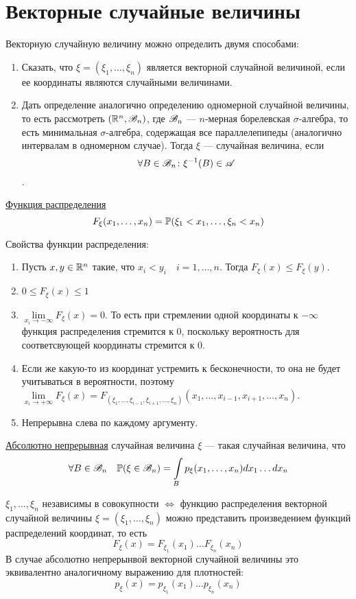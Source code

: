 \section{Векторные случайные величины}
Векторную случайную величину можно определить двумя способами:
\begin{enumerate}
	\item Сказать, что $\xi = (\xi_1, \ldots, \xi_n)$ является векторной случайной величиной, если ее координаты являются случайными величинами.
	\item Дать определение аналогично определению одномерной случайной величины, то есть рассмотреть $(\mathbb{R}^n, \mathscr{B}_n)$, где $\mathscr{B}_n$ --- $n$-мерная борелевская
	$\sigma$-алгебра, то есть минимальная $\sigma$-алгебра, содержащая все параллелепипеды (аналогично интервалам в одномерном случае). Тогда $\xi$ --- случайная величина, если $$\forall B \in \mathscr{B}_n \colon \xi^{-1}(B) \in \mathscr{A}$$. 
\end{enumerate}

\begin{Def}
\underline{Функция распределения} $$F_\xi(x_1, \ldots, x_n) = \mathbb{P}(\xi_1 < x_1, \ldots, \xi_n < x_n)$$
\end{Def}

Свойства функции распределения:
\begin{enumerate}
	\item Пусть $x, y \in \mathbb{R}^n$ такие, что $x_i < y_i \quad i = 1, \ldots, n$. Тогда $F_\xi(x) \le F_\xi(y)$.
	\item $0 \le F_\xi(x) \le 1$
	\item $\lim\limits_{x_i \to -\infty} F_\xi(x) = 0$. То есть при стремлении одной координаты к $-\infty$ функция распределения стремится к 0, поскольку вероятность для соответсвующей координаты стремится к 0.
	\item Если же какую-то из координат устремить к бесконечности, то она не будет учитываться в вероятности, поэтому 
	$\lim\limits_{x_i \to +\infty} F_\xi(x) = F_{(\xi_1, \ldots, \xi_{i-1}, \xi_{i+1}, \ldots, \xi_n)}(x_1, \ldots, x_{i-1}, x_{i+1}, \ldots, x_n)$.
	\item Непрерывна слева по каждому аргументу.
\end{enumerate}

\begin{Def}
\underline{Абсолютно непрерывная} случайная величина $\xi$ --- такая случайная величина, что
$$\forall B \in \mathscr{B}_n \quad \mathbb{P}(\xi \in \mathscr{B}_n) = \int\limits_B p_\xi(x_1, \ldots, x_n)dx_1\ldots dx_n$$ 
\end{Def}

$\xi_1, \ldots, \xi_n$ независимы в совокупности $\Leftrightarrow$ функцию распределения векторной случайной величины $\xi = (\xi_1, \ldots, \xi_n)$ можно представить произведением функций распределений координат, то есть 
$$F_\xi(x) = F_{\xi_1}(x_1)\ldots F_{\xi_n}(x_n)$$
В случае абсолютно непрерынвой векторной случайной величины это эквивалентно аналогичному выражению для плотностей:
$$p_\xi(x) = p_{\xi_1}(x_1)\ldots p_{\xi_n}(x_n)$$

\newpage

